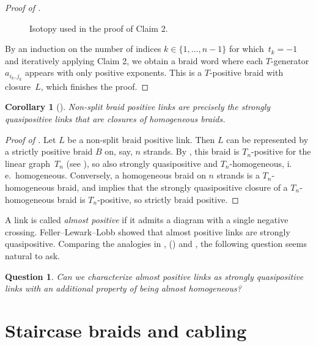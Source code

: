 \documentclass{amsart}
\theoremstyle{definition}
\theoremstyle{remark}
\theoremstyle{plain}
\newtheorem{corollary}[definition]{Corollary}
\newtheorem{question}[definition]{Question}%
\newcommand{\ie}{i.\,e.~}
\begin{document}
\begin{proof}[{Proof of }]
\begin{figure}[htbp] 
    \centering
     \def\svgwidth{0.9\columnwidth}
	  
	\caption{Isotopy used in the proof of Claim 2.}
    \label{fig:seifsurf_T-homo_2}
\end{figure}

By an induction on the number of indices $k \in \{1, \dots, n-1\}$ for which~$t_k = -1$ and iteratively applying Claim 2, we obtain a braid word where each $T$-generator $a_{i_k,j_k}$ appears with only positive exponents. This is a $T$-positive braid with closure~$L$, which finishes the proof.
\end{proof}

\begin{corollary}[{}]\label{cor:bp}
Non-split braid positive links are precisely the strongly quasipositive links that are closures of homogeneous braids. 
\end{corollary}

\begin{proof}[{Proof of }]
    Let $L$ be a non-split braid positive link. Then $L$ can be represented by a strictly positive braid $B$ on, say, $n$ strands. By , this braid is $T_n$-positive for the linear graph~$T_n$ (see ), so also strongly quasipositive and $T_n$-homogeneous, \ie homogeneous. Conversely, a homogeneous braid on $n$ strands is a $T_n$-homogeneous braid, and  implies that the strongly quasipositive closure of a $T_n$-homogeneous braid is $T_n$-positive, so strictly braid positive.
\end{proof}

A link is called \emph{almost positive} if it admits a diagram with a single negative crossing. Feller--Lewark--Lobb \cite{FLL:almostpos} showed that almost positive links are strongly quasipositive. 
Comparing the analogies in ,   () and , the following question seems natural to ask. 

\begin{question}
Can we characterize almost positive links as strongly quasipositive links with an additional property of being \emph{almost homogeneous}? 
\end{question}

\section{Staircase braids and cabling}\label{sec:cabling}
\end{document}
